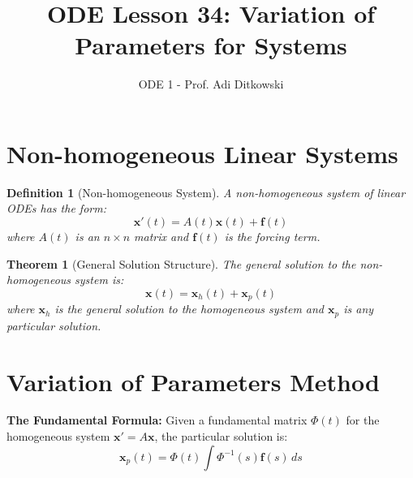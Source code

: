 \documentclass[12pt]{article}
\title{ODE Lesson 34: Variation of Parameters for Systems}
\author{ODE 1 - Prof. Adi Ditkowski}
\date{}
\newtheorem{definition}{Definition}
\newtheorem{theorem}{Theorem}
\begin{document}
\maketitle

\section{Non-homogeneous Linear Systems}

\begin{definition}[Non-homogeneous System]
A non-homogeneous system of linear ODEs has the form:
\[\mathbf{x}'(t) = A(t)\mathbf{x}(t) + \mathbf{f}(t)\]
where $A(t)$ is an $n \times n$ matrix and $\mathbf{f}(t)$ is the forcing term.
\end{definition}

\begin{theorem}[General Solution Structure]
The general solution to the non-homogeneous system is:
\[\mathbf{x}(t) = \mathbf{x}_{h}(t) + \mathbf{x}_{p}(t)\]
where $\mathbf{x}_{h}$ is the general solution to the homogeneous system and $\mathbf{x}_{p}$ is any particular solution.
\end{theorem}

\section{Variation of Parameters Method}

\begin{variation}
\textbf{The Fundamental Formula:}
Given a fundamental matrix $\Phi(t)$ for the homogeneous system $\mathbf{x}' = A\mathbf{x}$, the particular solution is:
\[\mathbf{x}_{p}(t) = \Phi(t)\int \Phi^{-1}(s)\mathbf{f}(s)\,ds\]
\end{variation}
\end{document}
